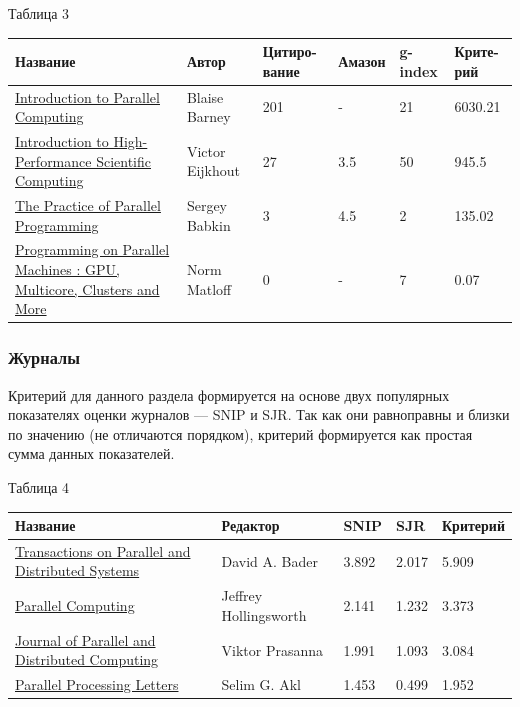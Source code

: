 \documentclass{article}
\begin{document}
			\begin{flushleft}
				Таблица 3
				\begin{longtable}{|p{6cm}|p{2.4cm}|p{1.6cm}|p{1.55cm}|p{1.55cm}|p{1.7cm}|}
\hline
Название & Автор & Цитиро-вание & Амазон & g-index & Крите-рий \\\hline

\href{https://computing.llnl.gov/tutorials/parallel_comp}{Introduction to Parallel Computing} &
Blaise Barney & 201 & - & 21 & 6030.21\\\hline
 
\href{http://pages.tacc.utexas.edu/~eijkhout/istc/istc.html}{Introduction to High-Performance Scientific Computing} &
Victor Eijkhout & 27 & 3.5 & 50 & 945.5\\\hline

\href{http://web.newsguy.com/sab123/tpopp}{The Practice of Parallel Programming} &
Sergey Babkin & 3 & 4.5 & 2 & 135.02\\\hline

\href{http://heather.cs.ucdavis.edu/parprocbook}{Programming on Parallel Machines : GPU, Multicore, Clusters and More} &
Norm Matloff & 0 & - & 7 & 0.07 \\\hline
				\end{longtable}
			\end{flushleft}
\newpage
		\subsubsection{Журналы}
		Критерий для данного раздела формируется на основе двух популярных показателях оценки журналов — SNIP и SJR. Так как они равноправны и близки по значению (не отличаются порядком), критерий формируется как простая сумма данных показателей.
		\begin{flushleft}
				Таблица 4
				\begin{longtable}{|p{7cm}|p{3cm}|p{1.5cm}|p{1.5cm}|p{2.3cm}|} \hline
				
Название & Редактор & SNIP & SJR & Критерий \\\hline

\href{https://www.computer.org/web/tpds}{Transactions on Parallel and Distributed Systems} &
David A. Bader  & 3.892 & 2.017 & 5.909\\\hline

\href{http://www.journals.elsevier.com/parallel-computing}{Parallel Computing} &
Jeffrey Hollingsworth &2.141 & 1.232 & 3.373\\\hline

\href{http://www.journals.elsevier.com/journal-of-parallel-and-distributed-computing}{Journal of Parallel and Distributed Computing} &
Viktor Prasanna & 1.991 & 1.093 & 3.084\\\hline

\href{http://www.worldscientific.com/loi/ppl}{Parallel Processing Letters} &
Selim G. Akl & 1.453 & 0.499 & 1.952\\\hline
				\end{longtable}
			\end{flushleft}	
\newpage
\end{document}
